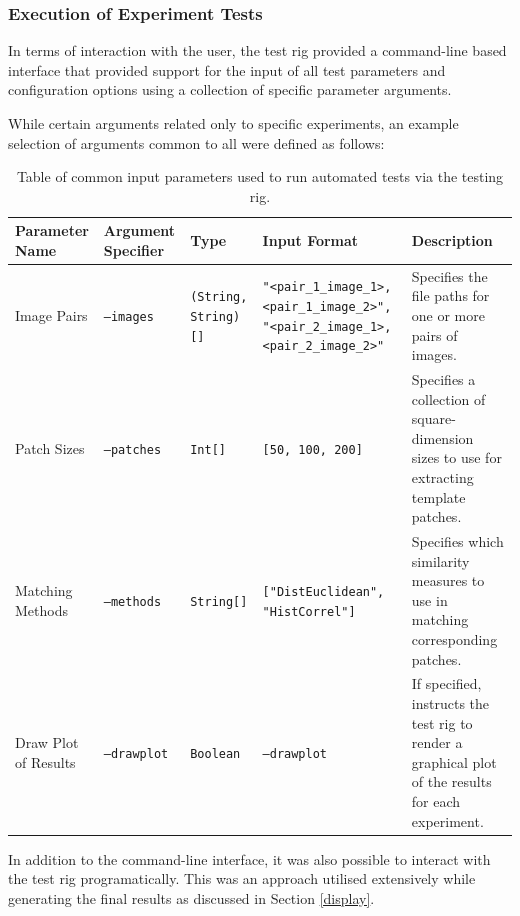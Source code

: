 
\subsubsection{Execution of Experiment Tests}

In terms of interaction with the user, the test rig provided a command-line based interface that provided support for the input of all test parameters and configuration options using a collection of specific parameter arguments. 

While certain arguments related only to specific experiments, an example selection of arguments common to all were defined as follows:

\begin{table}[h]
\small
\begin{tabular}{|p{2cm}|p{2cm}|p{2cm}|p{3.5cm}|p{3.5cm}|}
\hline
Parameter Name & Argument Specifier & Type  & Input Format & Description \\ \hline
Image Pairs & \texttt{--images} & \texttt{(String, String)[]} & \texttt{"\textless pair\_1\_image\_1\textgreater, \textless pair\_1\_image\_2\textgreater", "\textless pair\_2\_image\_1\textgreater, \textless pair\_2\_image\_2\textgreater"} & Specifies the file paths for one or more pairs of images. \\ \hline
Patch Sizes & \texttt{--patches} & \texttt{Int[]} & \texttt{[50, 100, 200]} & Specifies a collection of square-dimension sizes to use for extracting template patches. \\ \hline  
Matching Methods & \texttt{--methods} & \texttt{String[]} & \texttt{["DistEuclidean", "HistCorrel"]} & Specifies which similarity measures to use in matching corresponding patches. \\ \hline   
Draw Plot of Results & \texttt{--drawplot} & \texttt{Boolean} & \texttt{--drawplot} & If specified, instructs the test rig to render a graphical plot of the results for each experiment. \\ \hline  
\end{tabular}
\caption {Table of common input parameters used to run automated tests via the testing rig.}
\end{table}

In addition to the command-line interface, it was also possible to interact with the test rig programatically. This was an approach utilised extensively while generating the final results as discussed in Section \ref{display}.

%

